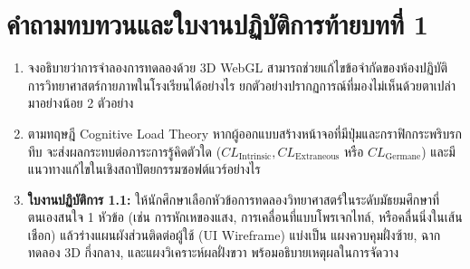 \section*{คำถามทบทวนและใบงานปฏิบัติการท้ายบทที่ 1}

\begin{enumerate}[leftmargin=1.5em, itemsep=8pt]
    \item จงอธิบายว่าการจำลองการทดลองด้วย 3D WebGL สามารถช่วยแก้ไขข้อจำกัดของห้องปฏิบัติการวิทยาศาสตร์กายภาพในโรงเรียนได้อย่างไร ยกตัวอย่างปรากฏการณ์ที่มองไม่เห็นด้วยตาเปล่ามาอย่างน้อย 2 ตัวอย่าง
    \item ตามทฤษฎี Cognitive Load Theory หากผู้ออกแบบสร้างหน้าจอที่มีปุ่มและกราฟิกกระพริบรกทึบ จะส่งผลกระทบต่อภาระการรู้คิดตัวใด ($CL_{\text{Intrinsic}}, CL_{\text{Extraneous}}$ หรือ $CL_{\text{Germane}}$) และมีแนวทางแก้ไขในเชิงสถาปัตยกรรมซอฟต์แวร์อย่างไร
    \item \textbf{ใบงานปฏิบัติการ 1.1:} ให้นักศึกษาเลือกหัวข้อการทดลองวิทยาศาสตร์ในระดับมัธยมศึกษาที่ตนเองสนใจ 1 หัวข้อ (เช่น การหักเหของแสง, การเคลื่อนที่แบบโพรเจกไทล์, หรือคลื่นนิ่งในเส้นเชือก) แล้วร่างแผนผังส่วนติดต่อผู้ใช้ (UI Wireframe) แบ่งเป็น แผงควบคุมฝั่งซ้าย, ฉากทดลอง 3D กึ่งกลาง, และแผงวิเคราะห์ผลฝั่งขวา พร้อมอธิบายเหตุผลในการจัดวาง
\end{enumerate}
